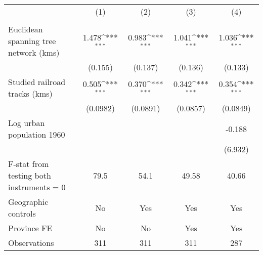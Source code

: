 {
\def\sym#1{\ifmmode^{#1}\else\(^{#1}\)\fi}
\begin{tabular}{l*{4}{c}}
\hline\hline
                &\multicolumn{1}{c}{(1)}&\multicolumn{1}{c}{(2)}&\multicolumn{1}{c}{(3)}&\multicolumn{1}{c}{(4)}\\
                &\multicolumn{1}{c}{}&\multicolumn{1}{c}{}&\multicolumn{1}{c}{}&\multicolumn{1}{c}{}\\
\hline
Euclidean spanning tree network (kms)&    1.478\sym{***}&    0.983\sym{***}&    1.041\sym{***}&    1.036\sym{***}\\
                &  (0.155)         &  (0.137)         &  (0.136)         &  (0.133)         \\
[1em]
Studied railroad tracks (kms)&    0.505\sym{***}&    0.370\sym{***}&    0.342\sym{***}&    0.354\sym{***}\\
                & (0.0982)         & (0.0891)         & (0.0857)         & (0.0849)         \\
[1em]
Log urban population 1960&                  &                  &                  &   -0.188         \\
                &                  &                  &                  &  (6.932)         \\
\hline
F-stat from testing both instruments = 0&     79.5         &     54.1         &    49.58         &    40.66         \\
Geographic controls&       No         &      Yes         &      Yes         &      Yes         \\
Province FE     &       No         &       No         &      Yes         &      Yes         \\
Observations    &      311         &      311         &      311         &      287         \\
\hline\hline
\end{tabular}
}
